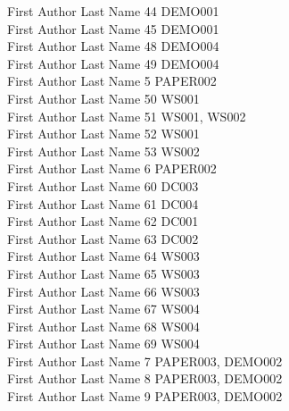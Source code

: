 \begin{multicols}{2}
First Author Last Name 44 \dotfill DEMO001\\
First Author Last Name 45 \dotfill DEMO001\\
First Author Last Name 48 \dotfill DEMO004\\
First Author Last Name 49 \dotfill DEMO004\\
First Author Last Name 5 \dotfill PAPER002\\
First Author Last Name 50 \dotfill WS001\\
First Author Last Name 51 \dotfill WS001, WS002\\
First Author Last Name 52 \dotfill WS001\\
First Author Last Name 53 \dotfill WS002\\
First Author Last Name 6 \dotfill PAPER002\\
First Author Last Name 60 \dotfill DC003\\
First Author Last Name 61 \dotfill DC004\\
First Author Last Name 62 \dotfill DC001\\
First Author Last Name 63 \dotfill DC002\\
First Author Last Name 64 \dotfill WS003\\
First Author Last Name 65 \dotfill WS003\\
First Author Last Name 66 \dotfill WS003\\
First Author Last Name 67 \dotfill WS004\\
First Author Last Name 68 \dotfill WS004\\
First Author Last Name 69 \dotfill WS004\\
First Author Last Name 7 \dotfill PAPER003, DEMO002\\
First Author Last Name 8 \dotfill PAPER003, DEMO002\\
First Author Last Name 9 \dotfill PAPER003, DEMO002\\
\end{multicols}
